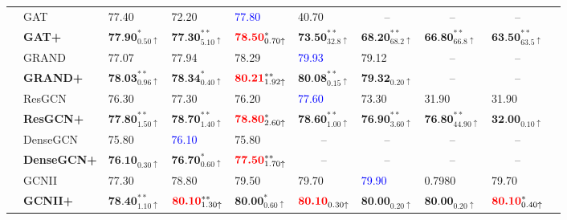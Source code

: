 \documentclass{article}
\begin{document}
\begin{table} [h!]
{\begin{tabular}{clllllllll}
     & GAT   & 77.40  & 72.20& \textcolor{blue}{77.80} &40.70 & \multicolumn{1}{c}{--}&\multicolumn{1}{c}{--}&\multicolumn{1}{c}{--}\\
      &\textbf{GAT+}& $\textbf{77.90}_{0.50 \uparrow }^{*}$  & $\textbf{77.30}_{5.10 \uparrow }^{**}$& $\textbf{\textcolor{red}{78.50}}_{0.70 \uparrow }^{*}$ &$\textbf{73.50}_{32.8 \uparrow }^{**}$ & $\textbf{68.20}_{68.2 \uparrow }^{**}$&$\textbf{66.80}_{66.8 \uparrow }^{**}$&$\textbf{63.50}_{63.5 \uparrow }^{**}$\\
     \cmidrule(r){2-9}
    & GRAND  & 77.07  & 77.94& 78.29 &\textcolor{blue}{79.93} &79.12 &\multicolumn{1}{c}{--}&\multicolumn{1}{c}{--}\\
     &\textbf{GRAND+}& $\textbf{78.03}_{0.96 \uparrow }^{**}$  & $\textbf{78.34}_{0.40 \uparrow }^{*}$& $\textbf{\textcolor{red}{80.21}}_{1.92 \uparrow }^{**}$ &$\textbf{80.08}_{0.15 \uparrow }^{**}$ &$\textbf{79.32}_{0.20 \uparrow }^{}$&\multicolumn{1}{c}{--}&\multicolumn{1}{c}{--}\\
     \cmidrule(r){2-9}
    & ResGCN  & 76.30  & 77.30& 76.20 &\textcolor{blue}{77.60} &73.30 &31.90 &31.90\\
     &\textbf{ResGCN+}& $\textbf{77.80}_{1.50 \uparrow }^{**}$  &$\textbf{78.70}_{1.40 \uparrow }^{**}$& $\textbf{\textcolor{red}{78.80}}_{2.60 \uparrow }^{*}$ &$\textbf{78.60}_{1.00 \uparrow }^{**}$ & $\textbf{76.90}_{3.60 \uparrow }^{**}$&$\textbf{76.80}_{44.90 \uparrow }^{**}$&$\textbf{32.00}_{0.10 \uparrow }^{}$\\
     \cmidrule(r){2-9}
    & DenseGCN  & 75.80  & \textcolor{blue}{76.10}& 75.80 &\multicolumn{1}{c}{--} &\multicolumn{1}{c}{--} &\multicolumn{1}{c}{--}&\multicolumn{1}{c}{--}\\
    &\textbf{DenseGCN+}& $\textbf{76.10}_{0.30 \uparrow }^{}$  & $\textbf{76.70}_{0.60 \uparrow }^{*}$& $\textbf{\textcolor{red}{77.50}}_{1.70 \uparrow }^{**}$ &\multicolumn{1}{c}{--}&  \multicolumn{1}{c}{--}&\multicolumn{1}{c}{--}&\multicolumn{1}{c}{--}\\
     \cmidrule(r){2-9}
    & GCNII  & 77.30  & 78.80& 79.50 &79.70 &\textcolor{blue}{79.90} &0.7980&79.70\\
    &\textbf{GCNII+}& $\textbf{78.40}_{1.10 \uparrow }^{**}$   &$\textbf{\textcolor{red}{80.10}}_{1.30 \uparrow }^{**}$ & $\textbf{80.00}_{0.60 \uparrow }^{*}$  &$\textbf{\textcolor{red}{80.10}}_{0.30 \uparrow }^{}$  & $\textbf{80.00}_{0.20 \uparrow }^{}$ &$\textbf{80.00}_{0.20 \uparrow }^{}$ & $\textbf{\textcolor{red}{80.10}}_{0.40 \uparrow }^{*}$ \\
    \bottomrule
  \end{tabular}}
\end{table}
\end{document}

